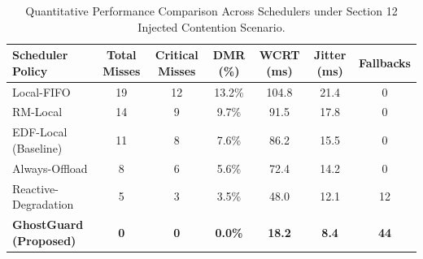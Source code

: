 \begin{table}[t]
\centering
\small
\caption{Quantitative Performance Comparison Across Schedulers under Section 12 Injected Contention Scenario.}
\label{tab:benchmark_summary}
\begin{tabular}{lcccccc}
\toprule
\textbf{Scheduler Policy} & \textbf{Total Misses} & \textbf{Critical Misses} & \textbf{DMR (\%)} & \textbf{WCRT (ms)} & \textbf{Jitter (ms)} & \textbf{Fallbacks} \\
\midrule
Local-FIFO             & 19 & 12 & 13.2\% & 104.8 & 21.4 & 0  \\
RM-Local               & 14 & 9  & 9.7\%  & 91.5  & 17.8 & 0  \\
EDF-Local (Baseline)   & 11 & 8  & 7.6\%  & 86.2  & 15.5 & 0  \\
Always-Offload         & 8  & 6  & 5.6\%  & 72.4  & 14.2 & 0  \\
Reactive-Degradation   & 5  & 3  & 3.5\%  & 48.0  & 12.1 & 12 \\
\midrule
\textbf{GhostGuard (Proposed)} & \textbf{0}  & \textbf{0}  & \textbf{0.0\%}  & \textbf{18.2}  & \textbf{8.4}  & \textbf{44} \\
\bottomrule
\end{tabular}
\end{table}
